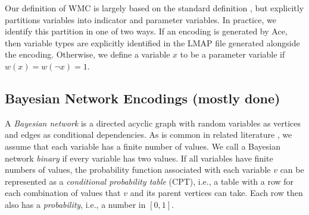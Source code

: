 \documentclass[runningheads]{llncs}
\begin{document}
Our definition of WMC is largely based on the standard definition
\cite{DBLP:journals/ai/ChaviraD08}, but explicitly partitions variables into
indicator and parameter variables. In practice, we identify this partition in
one of two ways. If an encoding is generated by \textsf{Ace}, then variable
types are explicitly identified in the LMAP file generated alongside the
encoding. Otherwise, we define a variable $x$ to be a parameter variable if
$w(x) = w(\neg x) = 1$.

\subsection{Bayesian Network Encodings (mostly done)}

A \emph{Bayesian network} is a directed acyclic graph with random variables as
vertices and edges as conditional dependencies. As is common in related
literature
\cite{DBLP:conf/kr/Darwiche02,DBLP:conf/aaai/SangBK05}, we assume that each
variable has a finite number of values. We call a Bayesian network \emph{binary}
if every variable has two values. If all variables have finite numbers of
values, the probability function associated with each variable $v$ can be
represented as a \emph{conditional probability table} (CPT), i.e., a table
with a row for each combination of values that $v$ and its parent vertices can
take. Each row then also has a \emph{probability}, i.e., a number in $[0, 1]$.
\end{document}
